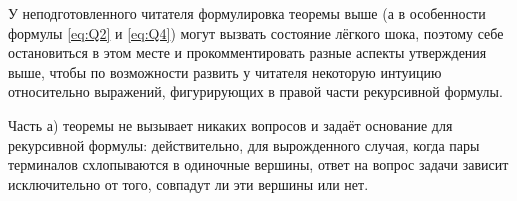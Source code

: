 
У неподготовленного читателя формулировка теоремы выше (а в особенности формулы \eqref{eq:Q2} и \eqref{eq:Q4}) могут вызвать состояние лёгкого шока, поэтому себе остановиться в этом месте и прокомментировать разные аспекты утверждения выше, чтобы по возможности развить у читателя некоторую интуицию относительно выражений, фигурирующих в правой части рекурсивной формулы.

Часть а) теоремы не вызывает никаких вопросов и задаёт основание для рекурсивной формулы: действительно, для вырожденного случая, когда пары терминалов схлопываются в одиночные вершины, ответ на вопрос задачи зависит исключительно от того, совпадут ли эти вершины или нет.

